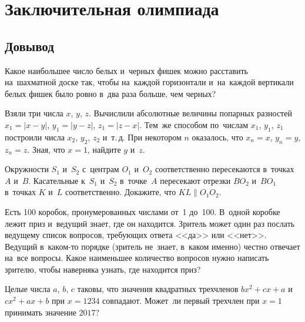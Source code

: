 
\section*{Заключительная олимпиада}


\subsection*{Довывод}

\begingroup
    \def\abs#1{\lvert #1 \rvert}%

\begin{problems}

\item
Какое наибольшее число белых и~черных фишек можно расставить на~шахматной доске
так, чтобы на~каждой горизонтали и~на~каждой вертикали белых фишек было ровно
в~два раза больше, чем черных?

\item
Взяли три числа $x$, $y$, $z$.
Вычислили абсолютные величины попарных разностей
$x_{1} = \abs{x - y}$, $y_{1} = \abs{y - z}$, $z_{1} = \abs{z - x}$.
Тем~же способом по~числам $x_{1}$, $y_{1}$, $z_{1}$ построили числа $x_{2}$,
$y_{2}$, $z_{2}$ и~т.\,д.
При некотором $n$ оказалось, что $x_{n} = x$, $y_{n} = y$, $z_{n} = z$.
Зная, что $x = 1$, найдите $y$ и~$z$.

\item
Окружности $S_1$ и~$S_2$ с~центрам $O_1$ и~$O_2$ соответственно пересекаются
в~точках $A$ и~$B$.
Касательные к~$S_1$ и~$S_2$ в~точке~$A$ пересекают отрезки $B O_2$ и~$B O_1$
в~точках $K$ и~$L$ соответственно.
Докажите, что $KL \parallel O_1 O_2$.

\item
Есть 100 коробок, пронумерованных числами от~1 до~100.
В~одной коробке лежит приз и~ведущий знает, где он находится.
Зритель может один раз послать ведущему список вопросов, требующих ответа
<<да>> или <<нет>>.
Ведущий в~каком-то порядке (зритель не~знает, в~каком именно) честно отвечает
на~все вопросы.
Какое наименьшее количество вопросов нужно написать зрителю, чтобы наверняка
узнать, где находится приз?

\item
Целые числа $a$, $b$, $c$ таковы, что значения квадратных трехчленов
$b x^2 + c x + a$ и~$c x^2 + a x + b$ при $x = 1234$ совпадают.
Может~ли первый трехчлен при $x = 1$ принимать значение $2017$?

\end{problems}

\endgroup %


